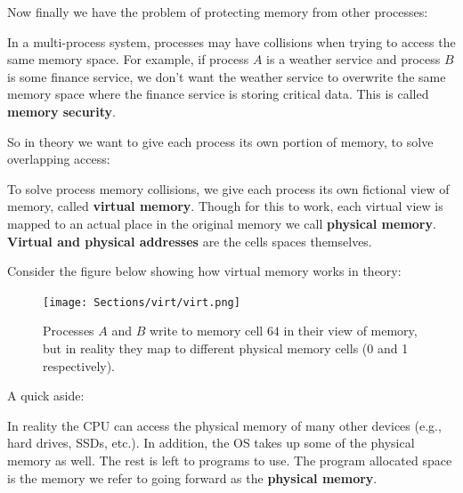 \noindent
Now finally we have the problem of protecting memory from other processes:

\begin{Def}

    In a multi-process system, processes may have collisions when trying to access the same memory space.
    For example, if process $A$ is a weather service and process $B$ is some finance service, we don't want 
    the weather service to overwrite the same memory space where the finance service is storing critical data.
    This is called \textbf{memory security}.
\end{Def}

\noindent
So in theory we want to give each process its own portion of memory, to solve overlapping access:
\begin{Def}

    To solve process memory collisions, we give each process its own fictional view of memory, called \textbf{virtual memory}.
    Though for this to work, each virtual view is mapped to an actual place in the original memory we call \textbf{physical memory}.\\

    \noindent
    \textbf{Virtual and physical addresses} are the cells spaces themselves.
\end{Def}

\newpage 

\noindent
Consider the figure below showing how virtual memory works in theory:

\begin{figure}[h]
    \centering
    \texttt{[image: Sections/virt/virt.png]}
    
    \vspace{1em}
    \caption{Processes $A$ and $B$ write to memory cell $64$ in their view of memory, but in reality they map 
    to different physical memory cells (0 and 1 respectively).}
    
    \label{fig:virt2}
\end{figure}

\noindent
A quick aside:

\begin{theo}

    In reality the CPU can access the physical memory of many other devices (e.g., hard drives, SSDs, etc.). In 
    addition, the OS takes up some of the physical memory as well. The rest is left to programs to use. The 
    program allocated space is the memory we refer to going forward as the \textbf{physical memory}.
\end{theo}


